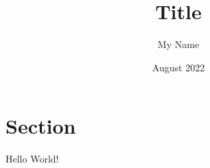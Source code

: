 \documentclass{article}
\title{Title}
\author{My Name}
\date{August 2022}
\begin{document}
\maketitle

\section{Section}

Hello World!
\end{document}
